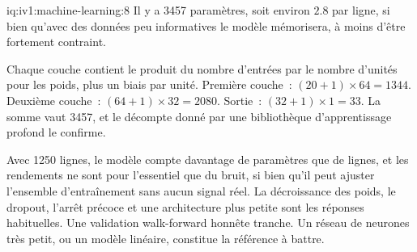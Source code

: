\begin{solution}{iq:iv1:machine-learning:8}
Il y a 3457 paramètres, soit environ $2.8$ par ligne, si bien qu'avec des données peu informatives le modèle mémorisera, à moins d'être fortement contraint.

Chaque couche contient le produit du nombre d'entrées par le nombre d'unités pour les poids, plus un biais par unité. Première couche~: $(20 + 1) \times 64 = 1344$. Deuxième couche~: $(64 + 1) \times 32 = 2080$. Sortie~: $(32 + 1) \times 1 = 33$. La somme vaut 3457, et le décompte donné par une bibliothèque d'apprentissage profond le confirme.

Avec 1250 lignes, le modèle compte davantage de paramètres que de lignes, et les rendements ne sont pour l'essentiel que du bruit, si bien qu'il peut ajuster l'ensemble d'entraînement sans aucun signal réel. La décroissance des poids, le dropout, l'arrêt précoce et une architecture plus petite sont les réponses habituelles. Une validation walk-forward honnête tranche. Un réseau de neurones très petit, ou un modèle linéaire, constitue la référence à battre.



\end{solution}

